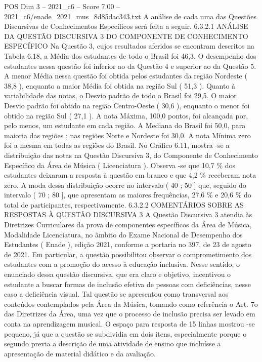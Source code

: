 \begin{textsample}{POS Dim 3 – 2021\_c6 – Score 7.00 – 2021\_c6/enade\_2021\_mus\_8d85dac343.txt}
A análise de cada uma das Questões Discursivas de Conhecimentos Específicos será feita a seguir. 6.3.2.1 ANÁLISE DA QUESTÃO DISCURSIVA 3 DO COMPONENTE DE CONHECIMENTO ESPECÍFICO Na Questão 3, cujos resultados aferidos se encontram descritos na Tabela 6.18, a Média dos estudantes de todo o Brasil foi 46,3.
O desempenho dos estudantes nessa questão foi inferior ao da Questão 4 e superior ao da Questão 5.
A menor Média nessa questão foi obtida pelos estudantes da região Nordeste ( 38,8 ), enquanto a maior Média foi obtida na região Sul ( 51,3 ).
Quanto à variabilidade das notas, o Desvio padrão de todo o Brasil foi 29,5.
O maior Desvio padrão foi obtido na região Centro-Oeste ( 30,6 ), enquanto o menor foi obtido na região Sul ( 27,1 ).
A nota Máxima, 100,0 pontos, foi alcançada por, pelo menos, um estudante em cada região.
A Mediana do Brasil foi 50,0, para maioria das regiões ; nas regiões Norte e Nordeste foi 30,0.
A nota Mínima zero foi a mesma em todas as regiões do Brasil.
No Gráfico 6.11, mostra -se a distribuição das notas na Questão Discursiva 3, do Componente de Conhecimento Específico da Área de Música ( Licenciatura ).
Observa -se que 10,7 \% dos estudantes deixaram a resposta à questão em branco e que 4,2 \% receberam nota zero.
A moda dessa distribuição ocorre no intervalo ( 40 ; 50 ] que, seguido do intervalo ( 70 ; 80 ], que apresentam as maiores frequências, 27,6 \% e 20,6 \% do total de participantes, respectivamente. 6.3.2.2 COMENTÁRIOS SOBRE AS RESPOSTAS À QUESTÃO DISCURSIVA 3 A Questão Discursiva 3 atendia às Diretrizes Curriculares da prova de componentes específicos da Área de Música, Modalidade Licenciatura, no âmbito do Exame Nacional de Desempenho dos Estudantes ( Enade ), edição 2021, conforme a portaria no 397, de 23 de agosto de 2021.
Em particular, a questão possibilitou observar o comprometimento dos estudantes com a promoção do acesso à educação inclusiva.
Nesse sentido, o enunciado dessa questão discursiva, que era claro e objetivo, incentivou o estudante a buscar formas de inclusão efetiva de pessoas com deficiências, nesse caso a deficiência visual.
Tal questão se apresentou como transversal aos conteúdos contemplados pela Área da Música, tomando como referência o Art. 7o das Diretrizes da Área, uma vez que o processo de inclusão precisa ser levado em conta na aprendizagem musical.
O espaço para resposta de 15 linhas mostrou -se pequeno, já que a questão se subdividia em dois itens, especialmente porque o segundo previa a descrição de uma atividade de ensino que incluísse a apresentação de material didático e da avaliação.

\end{textsample}
